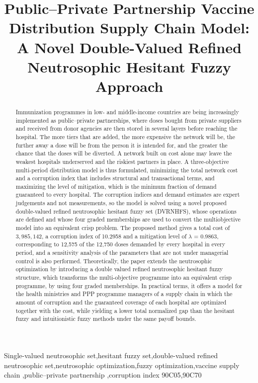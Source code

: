 \documentclass[a4paper]{elsarticle}
\begin{document}
\begin{frontmatter}

\title{Public--Private Partnership Vaccine Distribution Supply Chain Model: A Novel Double-Valued Refined Neutrosophic Hesitant Fuzzy Approach}

\begin{abstract}
Immunization programmes in low- and middle-income countries are being increasingly implemented as public--private partnerships, where doses bought from private suppliers and received from donor agencies are then stored in several layers before reaching the hospital. The more tiers that are added, the more expensive the network will be, the further away a dose will be from the person it is intended for, and the greater the chance that the doses will be diverted. A network built on cost alone may leave the weakest hospitals underserved and the riskiest partners in place. A three-objective multi-period distribution model is thus formulated, minimizing the total network cost and a corruption index that includes structural and transactional terms, and maximizing the level of mitigation, which is the minimum fraction of demand guaranteed to every hospital. The corruption indices and demand estimates are expert judgements and not measurements, so the model is solved using a novel proposed double-valued refined neutrosophic hesitant fuzzy set (DVRNHFS), whose operations are defined and whose four graded memberships are used to convert the multiobjective model into an equivalent crisp problem. The proposed method gives a total cost of $3,985,142$, a corruption index of 10.2958 and a mitigation level of $\lambda$ = 0.9863, corresponding to 12,575 of the 12,750 doses demanded by every hospital in every period, and a sensitivity analysis of the parameters that are not under managerial control is also performed. Theoretically, the paper extends the neutrosophic optimization by introducing a double valued refined neutrosophic hesitant fuzzy structure, which transforms the multi-objective programme into an equivalent crisp programme, by using four graded memberships. In practical terms, it offers a model for the health ministries and PPP programme managers of a supply chain in which the amount of corruption and the guaranteed coverage of each hospital are optimized together with the cost, while yielding a lower total normalized gap than the hesitant fuzzy and intuitionistic fuzzy methods under the same payoff bounds.
\end{abstract}

\begin{keyword}
Single-valued neutrosophic set\sep hesitant fuzzy set\sep double-valued refined neutrosophic set\sep neutrosophic optimization\sep fuzzy optimization\sep vaccine supply chain \sep public--private partnership \sep corruption index
\MSC[2020] 90C05\sep  90C70
\end{keyword}

\end{frontmatter}
\end{document}
